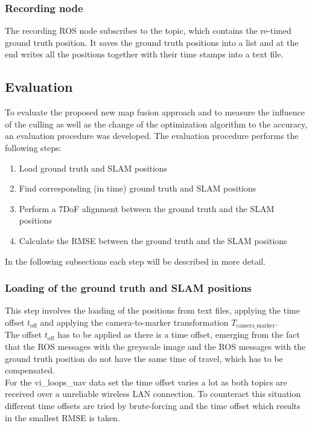 \subsubsection{Recording node}
\label{subsubsec:record_node}
The recording \ac{ROS} node subscribes to the topic, which contains the re-timed ground truth position. It saves the ground truth positions into a list and at the end writes all the positions together with their time stamps into a text file.

\subsection{Evaluation}
To evaluate the proposed new map fusion approach and to measure the influence of the culling as well as the change of the optimization algorithm to the accuracy, an evaluation procedure was developed. The evaluation procedure performs the following steps:

\begin{enumerate}
  \item Load ground truth and \ac{SLAM} positions
  \item Find corresponding (in time) ground truth and \ac{SLAM} positions
  \item Perform a 7DoF alignment between the ground truth and the \ac{SLAM} positions
  \item Calculate the \acf{RMSE} between the ground truth and the \ac{SLAM} positions
\end{enumerate}

In the following subsections each step will be described in more detail.

\subsubsection{Loading of the ground truth and \ac{SLAM} positions}
This step involves the loading of the positions from text files, applying the time offset $t_{\text{off}}$ and applying the camera-to-marker transformation $T_{\text{camera\_marker}}$.\\

The offset $t_{\text{off}}$ has to be applied as there is a time offset, emerging from the fact that the \ac{ROS} messages with the greyscale image and the \ac{ROS} messages with the ground truth position do not have the same time of travel, which has to be compensated.\\
For the vi\_loops\_uav data set the time offset varies a lot as both topics are received over a unreliable wireless LAN connection. To counteract this situation different time offsets are tried by brute-forcing and the time offset which results in the smallest \ac{RMSE} is taken.\\ 

